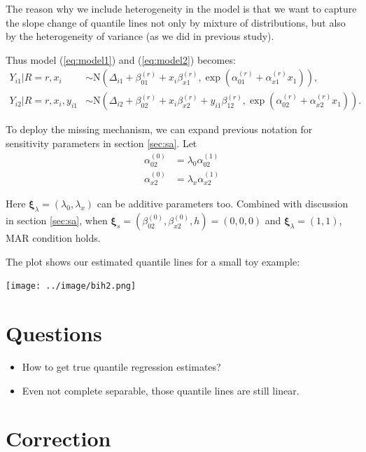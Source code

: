 \documentclass[12pt]{article}
\begin{document}
The reason why we include heterogeneity in the model is that we want
to capture the slope change of quantile lines not only by mixture of
distributions, but also by the heterogeneity of variance (as we did in
previous study).

Thus model (\ref{eq:model1}) and (\ref{eq:model2}) becomes:
\begin{align*}
  Y_{i1}|R = r, x_i &\sim \textrm{N}(\Delta_{i1} + \beta_{01}^{(r)} + x_i\beta_{x1}^{(r)}, \exp(\alpha_{01}^{(r)} + \alpha_{x1}^{(r)} x_1)),\\
  Y_{i2}|R = r, x_i, y_{i1} & \sim \textrm{N}(\Delta_{i2} +
  \beta_{02}^{(r)} + x_i\beta_{x2}^{(r)} + y_{i1}\beta_{12}^{(r)},
  \exp(\alpha_{02}^{(r)} + \alpha_{x2}^{(r)} x_1 )).
\end{align*}

To deploy the missing mechanism, we can expand previous notation for
sensitivity parameters in section \ref{sec:sa}. Let
\begin{align*}
  \alpha_{02}^{(0)} & = \lambda_0 \alpha_{02}^{(1)} \\
  \alpha_{x2}^{(0)} & = \lambda_x \alpha_{x2}^{(1)}
\end{align*}

Here $\bm \xi_{\lambda} = (\lambda_0, \lambda_x) $ can be additive
parameters too. Combined with discussion in section \ref{sec:sa}, when
$\bm \xi_s = (\beta_{02}^{(0)} , \beta_{x2}^{(0)}, h) = (0, 0, 0) $
and $\bm \xi_{\lambda} = (1, 1)$, MAR condition holds.

The plot shows our estimated quantile lines for a small toy example:

\begin{center}
  \texttt{[image: ../image/bih2.png]}
\end{center}

\section{Questions}
 
\begin{itemize}
\item How to get true quantile regression estimates?
\item Even not complete separable, those quantile lines are still linear. 
\end{itemize}

\section{Correction}
\end{document}
